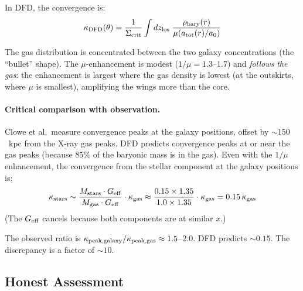 \documentclass[11pt,a4paper]{article}
\newcommand{\Geff}{G_{\rm eff}}
\begin{document}
In DFD, the convergence is:
\begin{equation}
\kappa_{\rm DFD}(\theta) = \frac{1}{\Sigma_{\rm crit}}\int dz_{\rm los}\;
\frac{\rho_{\rm bary}(r)}{\mu(a_{\rm tot}(r)/a_0)}
\end{equation}

The gas distribution is concentrated between the two galaxy
concentrations (the ``bullet'' shape).  The $\mu$-enhancement is
modest ($1/\mu = 1.3$--$1.7$) and \emph{follows the gas}:
the enhancement is largest where the gas density is lowest
(at the outskirts, where $\mu$ is smallest), amplifying the
wings more than the core.

\paragraph{Critical comparison with observation.}
Clowe et al.\ measure convergence peaks at the galaxy positions, offset
by $\sim 150$~kpc from the X-ray gas peaks.  DFD predicts convergence
peaks at or near the gas peaks (because $85\%$ of the baryonic mass
is in the gas).  Even with the $1/\mu$ enhancement, the convergence
from the stellar component at the galaxy positions is:
\begin{equation}
\kappa_{\rm stars} \sim \frac{M_{\rm stars} \cdot \Geff}{M_{\rm gas} \cdot \Geff}
\cdot \kappa_{\rm gas} \approx \frac{0.15 \times 1.35}{1.0 \times 1.35}
\cdot \kappa_{\rm gas} = 0.15\,\kappa_{\rm gas}
\end{equation}
(The $\Geff$ cancels because both components are at similar $x$.)

The observed ratio is $\kappa_{\rm peak,galaxy}/\kappa_{\rm peak,gas}
\approx 1.5$--$2.0$.  DFD predicts $\sim 0.15$.  The discrepancy is
a factor of $\sim 10$.

\subsection{Honest Assessment}
\end{document}
